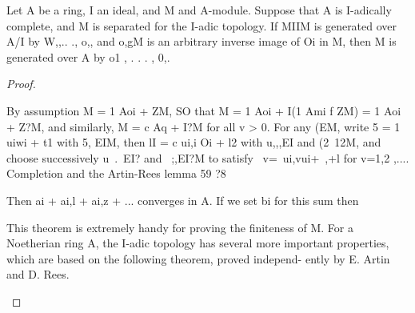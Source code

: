 \begin{theorem}[Theorem 8.4]\label{mcrt-auto-theorem-8-4}\uses{}
\begin{mathematicalrecord}
Let A be a ring, I an ideal, and M and A-module. Suppose
that A is I-adically complete, and M is separated for the I-adic topology. If
MIIM is generated over A/I by W,,.. ., o,, and o,gM is an arbitrary
inverse image of Oi in M, then M is generated over A by o1 , . . . , 0,.
\end{mathematicalrecord}
\end{theorem}
\begin{proof}
\begin{mathematicalrecord}
By assumption M = 1 Aoi + ZM, SO that M = 1 Aoi + I(1 Ami f
ZM) = 1 Aoi + Z?M, and similarly, M = c Aq + I?M for all v > 0. For
any (EM, write 5 = 1 uiwi + t1 with 5, EIM, then lI = c ui,i Oi + l2 with
u,,,EI and (2~12M, and choose successively u~.~EI? and ~;,EI?M to satisfy
         ~v=~ui,vui+~,+l        for v=1,2 ,....
Completion and the Artin-Rees       lemma                            59
?8

Then ai + ai,l + ai,z + ... converges in A. If we set bi for this sum then


   This theorem is extremely handy for proving the finiteness of M. For a
Noetherian ring A, the I-adic topology has several more important
properties, which are based on the following theorem, proved independ-
ently by E. Artin and D. Rees.
\end{mathematicalrecord}
\end{proof}


